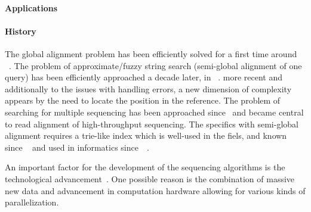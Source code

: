 \paragraph{Applications}

\paragraph{History} The global alignment problem has been efficiently solved for
a first time around
\citeyear{vintsyuk1968speech}~\cite{vintsyuk1968speech,needleman1970general}.
The problem of approximate/fuzzy string search (semi-global alignment of one
query) has been efficiently approached a decade later, in
\citeyear{sellers1980theory}~\cite{sellers1980theory,smith1981identification}.
more recent and additionally to the issues with handling errors, a new dimension
of complexity appears by the need to locate the position in the reference. The
problem of searching for multiple sequencing has been approached
since\citeyear{pearson1988improved}~\cite{pearson1988improved} and became
central to read alignment of high-throughput sequencing. The specifics with
semi-global alignment requires a trie-like index which is well-used in the
fiels, and known since
\citeyear{thue1912gegenseitige}~\cite{thue1912gegenseitige} and used in
informatics since~\citeyear{de1959file}~\cite{de1959file}.

An important factor for the development of the sequencing algorithms is the
technological advancement~\cite{alser2021technology}. One possible reason is the
combination of massive new data and advancement in computation hardware allowing
for various kinds of parallelization.


